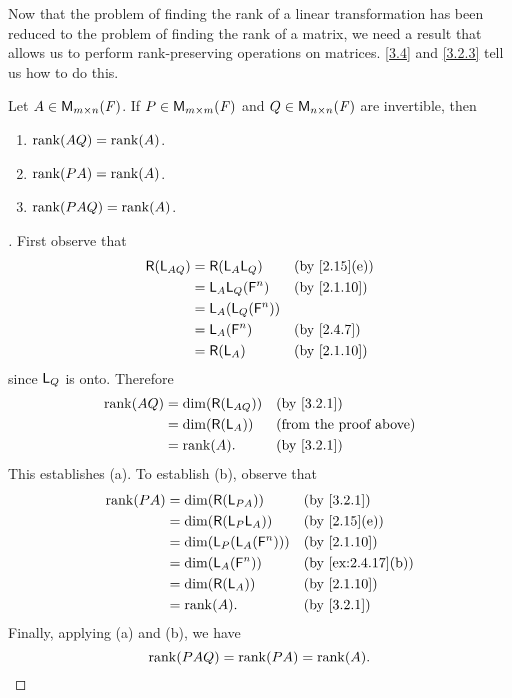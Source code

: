 \begin{note}
	Now that the problem of finding the rank of a linear transformation has been reduced to the problem of finding the rank of a matrix, we need a result that allows us to perform rank-preserving operations on matrices.
	\cref{3.4} and \cref{3.2.3} tell us how to do this.
\end{note}

\begin{thm}\label{3.4}
	Let \(A \in \ms\).
	If \(P \in \ms[m][m][\F]\) and \(Q \in \ms[n][n][\F]\) are invertible, then
	\begin{enumerate}
		\item \(\rk{AQ} = \rk{A}\).
		\item \(\rk{PA} = \rk{A}\).
		\item \(\rk{PAQ} = \rk{A}\).
	\end{enumerate}
\end{thm}

\begin{proof}[]
	First observe that
	\begin{align*}
		\rg{\L_{AQ}} & = \rg{\L_A \L_Q}       &  & \by{2.15}[e] \\
		             & = \L_A \L_Q(\vs{F}^n)  &  & \by{2.1.10}  \\
		             & = \L_A(\L_Q(\vs{F}^n))                   \\
		             & = \L_A(\vs{F}^n)       &  & \by{2.4.7}   \\
		             & = \rg{\L_A}            &  & \by{2.1.10}
	\end{align*}
	since \(\mathsf{L}_Q\) is onto.
	Therefore
	\begin{align*}
		\rk{AQ} & = \dim(\rg{\L_{AQ}}) &  & \by{3.2.1}                    \\
		        & = \dim(\rg{\L_A})    &  & \text{(from the proof above)} \\
		        & = \rk{A}.            &  & \by{3.2.1}
	\end{align*}
	This establishes (a).
	To establish (b), observe that
	\begin{align*}
		\rk{PA} & = \dim(\rg{\L_{PA}})         &  & \by{3.2.1}        \\
		        & = \dim(\rg{\L_P \L_A})       &  & \by{2.15}[e]      \\
		        & = \dim(\L_P(\L_A(\vs{F}^n))) &  & \by{2.1.10}       \\
		        & = \dim(\L_A(\vs{F}^n))       &  & \by{ex:2.4.17}[b] \\
		        & = \dim(\rg{\L_A})            &  & \by{2.1.10}       \\
		        & = \rk{A}.                    &  & \by{3.2.1}
	\end{align*}
	Finally, applying (a) and (b), we have
	\[
		\rk{PAQ} = \rk{PA} = \rk{A}.
	\]
\end{proof}

